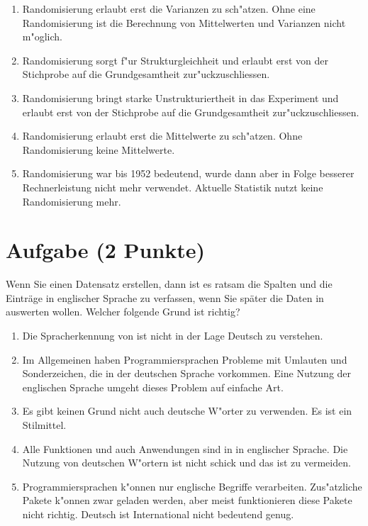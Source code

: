 \documentclass[a4paper, 10pt]{scrartcl}\usepackage[]{graphicx}\usepackage[]{xcolor}
\begin{document}
\begin{enumerate}
\item [\textbf{A} \msquare] Randomisierung erlaubt erst die Varianzen zu sch{"a}tzen. Ohne eine Randomisierung ist die Berechnung von Mittelwerten und Varianzen nicht m{"o}glich.
\item [\textbf{B} \msquare] Randomisierung sorgt f{"u}r Strukturgleichheit und erlaubt erst von der Stichprobe auf die Grundgesamtheit zur{"u}ckzuschliessen.
\item [\textbf{C} \msquare] Randomisierung bringt starke Unstrukturiertheit in das Experiment und erlaubt erst von der Stichprobe auf die Grundgesamtheit zur{"u}ckzuschliessen.
\item [\textbf{D} \msquare] Randomisierung erlaubt erst die Mittelwerte zu sch{"a}tzen. Ohne Randomisierung keine Mittelwerte.
\item [\textbf{E} \msquare] Randomisierung war bis 1952 bedeutend, wurde dann aber in Folge besserer Rechnerleistung nicht mehr verwendet. Aktuelle Statistik nutzt keine Randomisierung mehr.
\end{enumerate}

\section{Aufgabe \hfill (2 Punkte)}

Wenn Sie einen Datensatz erstellen, dann ist es ratsam die Spalten und die
Eintr{\"a}ge in englischer Sprache zu verfassen, wenn Sie sp{\"a}ter die Daten in
\Rlogo auswerten wollen. Welcher folgende Grund ist richtig?



\begin{enumerate}
\item [\textbf{A} \msquare] Die Spracherkennung von \Rlogo ist nicht in der Lage Deutsch zu verstehen.
\item [\textbf{B} \msquare] Im Allgemeinen haben Programmiersprachen Probleme mit Umlauten und Sonderzeichen, die in der deutschen Sprache vorkommen. Eine Nutzung der englischen Sprache umgeht dieses Problem auf einfache Art.
\item [\textbf{C} \msquare] Es gibt keinen Grund nicht auch deutsche W{"o}rter zu verwenden. Es ist ein Stilmittel.
\item [\textbf{D} \msquare] Alle Funktionen und auch Anwendungen sind in \Rlogo in englischer Sprache. Die Nutzung von deutschen W{"o}rtern ist nicht schick und das ist zu vermeiden.
\item [\textbf{E} \msquare] Programmiersprachen k{"o}nnen nur englische Begriffe verarbeiten. Zus{"a}tzliche Pakete k{"o}nnen zwar geladen werden, aber meist funktionieren diese Pakete nicht richtig. Deutsch ist International nicht bedeutend genug.
\end{enumerate}
\end{document}
